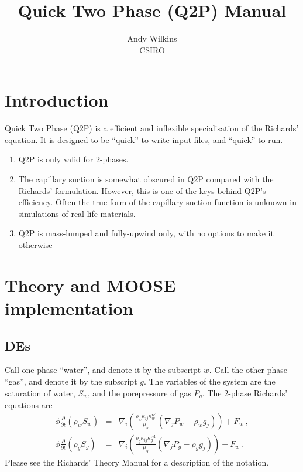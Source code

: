 \documentclass[]{scrreprt}
\begin{document}
\title{Quick Two Phase (Q2P) Manual}
\author{Andy Wilkins \\
CSIRO}
\maketitle

\tableofcontents

\chapter{Introduction}

Quick Two Phase (Q2P) is a efficient and inflexible specialisation of
the Richards' equation.  It is designed to be ``quick'' to write input
files, and ``quick'' to run.
\begin{enumerate}
\item Q2P is only valid for 2-phases.
\item The capillary suction is somewhat obscured in Q2P compared with
  the Richards' formulation.  However, this is one of the keys behind
  Q2P's efficiency.  Often the true form of the capillary suction
  function is unknown in simulations of real-life materials.
\item Q2P is mass-lumped and fully-upwind only, with no options to
  make it otherwise
\end{enumerate}



\chapter{Theory and MOOSE implementation}
\label{chap.theory}


\section{DEs}

Call one phase ``water'', and denote it by the subscript $w$.  Call the
other phase ``gas'', and denote it by the subscript $g$.  The
variables of the system are the saturation of water, $S_{w}$, and the
porepressure of gas $P_{g}$.  The 2-phase Richards' equations are
\begin{eqnarray}
\phi \frac{\partial}{\partial t} \left( \rho_{w} S_{w} \right) & = & \nabla_{i}
\left( \frac{\rho_{w} \kappa_{ij}\kappa_{w}^{\mathrm{rel}}}{\mu_{w}} (\nabla_{j}P_{w} - \rho_{w} g_{j}) \right)
+ F_{w} \ , \nonumber \\
\phi \frac{\partial}{\partial t} \left( \rho_{g} S_{g} \right) & = & \nabla_{i}
\left( \frac{\rho_{g} \kappa_{ij}\kappa_{g}^{\mathrm{rel}}}{\mu_{g}} (\nabla_{j}P_{g} - \rho_{g} g_{j}) \right)
+ F_{w} \ .
\label{q2p_orig.eqn}
\end{eqnarray}
Please see the Richards' Theory Manual for a description of the
notation.
\end{document}
